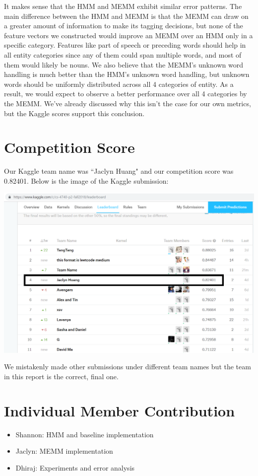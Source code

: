 \documentclass[12pt]{article}
\begin{document}
It makes sense that the HMM and MEMM exhibit similar error patterns. The main difference between the HMM and MEMM is that the MEMM can draw on a greater amount of information to make its tagging decisions, but none of the feature vectors we constructed would improve an MEMM over an HMM only in a specific category. Features like part of speech or preceding words should help in all entity categories since any of them could span multiple words, and most of them would likely be nouns. We also believe that the MEMM's unknown word handling is much better than the HMM's unknown word handling, but unknown words should be uniformly distributed across all 4 categories of entity. As a result, we would expect to observe a better performance over all 4 categories by the MEMM. We've already discussed why this isn't the case for our own metrics, but the Kaggle scores support this conclusion.
  
\section{Competition Score}
Our Kaggle team name was ``Jaclyn Huang" and our competition score was 0.82401. Below is the image of the Kaggle submission:
\begin{center}
	\includegraphics[scale=0.25]{kaggle.png}
\end{center}
We mistakenly made other submissions under different team names but the team in this report is the correct, final one. 

\section{Individual Member Contribution}
\begin{itemize}
	\item Shannon: HMM and baseline implementation
	\item Jaclyn: MEMM implementation
	\item Dhiraj: Experiments and error analysis
\end{itemize}
\end{document}

